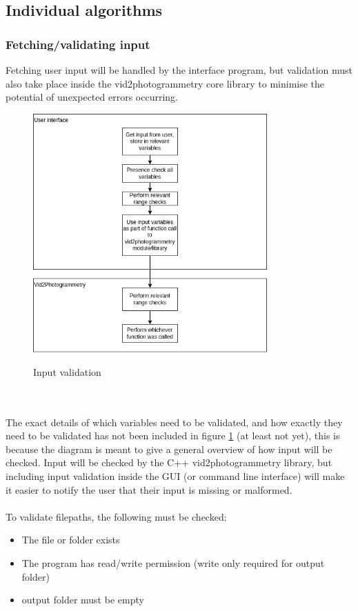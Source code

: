 \documentclass[11pt]{report}
\begin{document}
\subsection{Individual algorithms}\label{indivAlgorithms}
\subsubsection{Fetching/validating input}
Fetching user input will be handled by the interface program, but validation must also take place inside the vid2photogrammetry core library to minimise the potential of unexpected errors occurring.
\begin{figure}[h!]
	\centering
	\caption{Input validation}
	\includegraphics[width=0.8\textwidth]{designDiagrams/fetchingValidatingInput}
	\label{fig:fetchingValidatingInput}
\end{figure}\\\\
The exact details of which variables need to be validated, and how exactly they need to be validated has not been included in figure \ref{fig:fetchingValidatingInput} (at least not yet), this is because the diagram is meant to give a general overview of how input will be checked. Input will be checked by the C++ vid2photogrammetry library, but including input validation inside the GUI (or command line interface) will make it easier to notify the user that their input is missing or malformed.\\\\
To validate filepaths, the following must be checked:
\begin{itemize}
\item The file or folder exists
\item The program has read/write permission (write only required for output folder)
\item output folder must be empty
\end{itemize}
\end{document}
